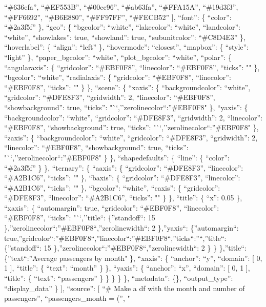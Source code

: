 \documentclass[
]{article}
\begin{document}
``\#636efa'', ``\#EF553B'', ``\#00cc96'', ``\#ab63fa'', ``\#FFA15A'',
``\#19d3f3'', ``\#FF6692'', ``\#B6E880'', ``\#FF97FF'', ``\#FECB52''
{]}, ``font'': \{ ``color'': ``\#2a3f5f'' \}, ``geo'': \{ ``bgcolor'':
``white'', ``lakecolor'': ``white'', ``landcolor'': ``white'',
``showlakes'': true, ``showland'': true, ``subunitcolor'': ``\#C8D4E3''
\}, ``hoverlabel'': \{ ``align'': ``left'' \}, ``hovermode'':
``closest'', ``mapbox'': \{ ``style'': ``light'' \}, ``paper\_bgcolor'':
``white'', ``plot\_bgcolor'': ``white'', ``polar'': \{ ``angularaxis'':
\{ ``gridcolor'': ``\#EBF0F8'', ``linecolor'': ``\#EBF0F8'', ``ticks'':
"" \}, ``bgcolor'': ``white'', ``radialaxis'': \{ ``gridcolor'':
``\#EBF0F8'', ``linecolor'': ``\#EBF0F8'', ``ticks'': "" \} \},
``scene'': \{ ``xaxis'': \{ ``backgroundcolor'': ``white'',
``gridcolor'': ``\#DFE8F3'', ``gridwidth'': 2, ``linecolor'':
``\#EBF0F8'', ``showbackground'': true, ``ticks'':
"``,''zerolinecolor``:''\#EBF0F8" \}, ``yaxis'': \{ ``backgroundcolor'':
``white'', ``gridcolor'': ``\#DFE8F3'', ``gridwidth'': 2, ``linecolor'':
``\#EBF0F8'', ``showbackground'': true, ``ticks'':
"``,''zerolinecolor``:''\#EBF0F8" \}, ``zaxis'': \{ ``backgroundcolor'':
``white'', ``gridcolor'': ``\#DFE8F3'', ``gridwidth'': 2, ``linecolor'':
``\#EBF0F8'', ``showbackground'': true, ``ticks'':
"``,''zerolinecolor``:''\#EBF0F8" \} \}, ``shapedefaults'': \{ ``line'':
\{ ``color'': ``\#2a3f5f'' \} \}, ``ternary'': \{ ``aaxis'': \{
``gridcolor'': ``\#DFE8F3'', ``linecolor'': ``\#A2B1C6'', ``ticks'': ""
\}, ``baxis'': \{ ``gridcolor'': ``\#DFE8F3'', ``linecolor'':
``\#A2B1C6'', ``ticks'': "" \}, ``bgcolor'': ``white'', ``caxis'': \{
``gridcolor'': ``\#DFE8F3'', ``linecolor'': ``\#A2B1C6'', ``ticks'': ""
\} \}, ``title'': \{ ``x'': 0.05 \}, ``xaxis'': \{ ``automargin'': true,
``gridcolor'': ``\#EBF0F8'', ``linecolor'': ``\#EBF0F8'', ``ticks'':
"``,''title``: \{''standoff``: 15
\},''zerolinecolor``:''\#EBF0F8``,''zerolinewidth``: 2 \},''yaxis``:
\{''automargin``:
true,''gridcolor``:''\#EBF0F8``,''linecolor``:''\#EBF0F8``,''ticks``:''``,''title``:
\{''standoff``: 15 \},''zerolinecolor``:''\#EBF0F8``,''zerolinewidth``:
2 \} \} \},''title``: \{''text``:''Average passengers by month" \},
``xaxis'': \{ ``anchor'': ``y'', ``domain'': {[} 0, 1 {]}, ``title'': \{
``text'': ``month'' \} \}, ``yaxis'': \{ ``anchor'': ``x'', ``domain'':
{[} 0, 1 {]}, ``title'': \{ ``text'': ``passengers'' \} \} \} \} \},
``metadata'': \{\}, ``output\_type'': ``display\_data'' \} {]},
``source'': {[} ``\# Make a df with the month and number of
passengers\n'', ``passengers\_month = (\n'', "
\end{document}
